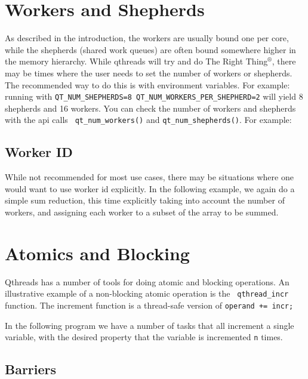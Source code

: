 \documentclass[12pt]{article}
\begin{document}
\section{Workers and Shepherds}

As described in the introduction, the workers are usually bound one per core,
while the shepherds (shared work queues) are often bound somewhere higher in the
memory hierarchy. While qthreads will try and do The Right Thing$^{\circledR}$,
there may be times where the user needs to set the number of workers or
shepherds. The recommended way to do this is with environment variables. For
example: running with {\tt QT\_NUM\_SHEPHERDS=8
QT\_NUM\_WORKERS\_PER\_SHEPHERD=2} will yield 8 shepherds and 16 workers. You
can check the number of workers and shepherds with the api calls {\tt
qt\_num\_workers()} and {\tt qt\_num\_shepherds()}. For example:



\subsection{Worker ID}

While not recommended for most use cases, there may be situations where one
would want to use worker id explicitly. In the following example, we again do a
simple sum reduction, this time explicitly taking into account the number of
workers, and assigning each worker to a subset of the array to be summed.



\section{Atomics and Blocking}

Qthreads has a number of tools for doing atomic and blocking operations. An
illustrative example of a non-blocking atomic operation is the {\tt
qthread\_incr} function. The increment function is a thread-safe version of
{\tt *operand += incr;}

In the following program we have a number of tasks that all increment a single
variable, with the desired property that the variable is incremented {\tt n}
times.
\\




\subsection{Barriers}
\end{document}
